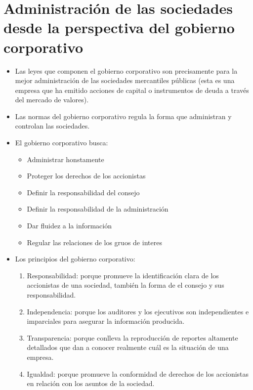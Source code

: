 \documentclass{article}
\begin{document}
\section{Administración de las sociedades desde la perspectiva del gobierno corporativo}
\begin{itemize}
    \item Las leyes que componen el gobierno corporativo son precisamente para la mejor administración de las sociedades mercantiles públicas (esta es una empresa que ha emitido acciones de capital o instrumentos de deuda a través del mercado de valores).
    \item Las normas del gobierno corporativo regula la forma que administran y controlan las sociedades.
    \item El gobierno corporativo busca:
    \begin{itemize}
        \item Administrar honstamente
        \item Proteger los derechos de los accionistas
        \item Definir la responsabilidad del consejo
        \item Definir la responsabilidad de la administración
        \item Dar fluidez a la información  
        \item Regular las relaciones de los gruos de interes
    \end{itemize}

    
    \item Los principios del gobierno corporativo:
    \begin{enumerate}
        \item Responsabilidad: porque promueve la identificación clara de los accionistas de una sociedad, también la forma de el consejo y sus responsabilidad.
        \item Independencia: porque los auditores y los ejecutivos son independientes e imparciales para asegurar la información producida. 
        \item Transparencia: porque conlleva la reproducción de reportes altamente detallados que dan a conocer realmente cuál es la situación de una empresa.
        \item Igualdad: porque promueve la conformidad de derechos de los accionistas en relación con los asuntos de la sociedad.
    \end{enumerate}


\end{itemize}
\end{document}
